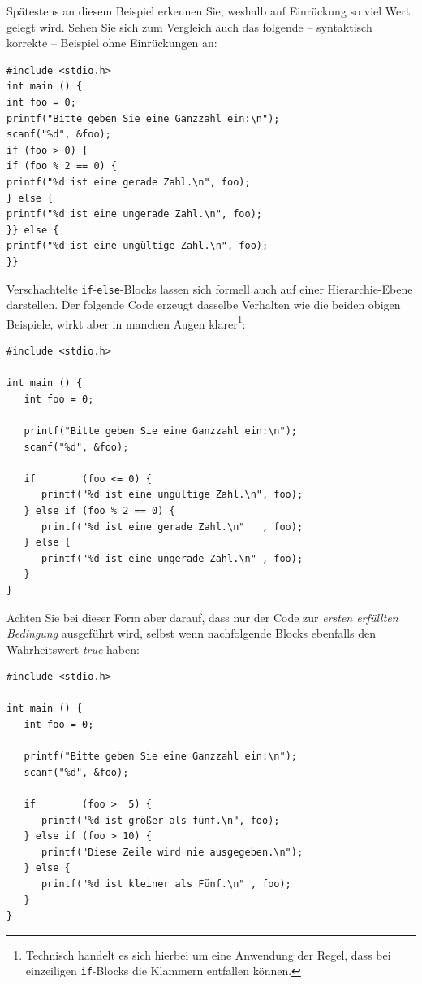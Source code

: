 Spätestens an diesem Beispiel erkennen Sie, weshalb auf Einrückung so viel Wert gelegt wird. Sehen Sie sich zum Vergleich auch das folgende -- syntaktisch korrekte -- Beispiel ohne Einrückungen an:

\begin{warnbox}[Schlechter Stil: Code mit mehreren Hierarchie-Ebenen ohne Einrückungen, leftupper=7mm]
\begin{verbatim}
#include <stdio.h>
int main () {
int foo = 0;
printf("Bitte geben Sie eine Ganzzahl ein:\n");
scanf("%d", &foo);
if (foo > 0) {
if (foo % 2 == 0) {
printf("%d ist eine gerade Zahl.\n", foo);
} else {
printf("%d ist eine ungerade Zahl.\n", foo);
}} else {
printf("%d ist eine ungültige Zahl.\n", foo);
}}
\end{verbatim}
\end{warnbox}

Verschachtelte \texttt{if}-\texttt{else}-Blocks lassen sich formell auch auf einer Hierarchie-Ebene darstellen. Der folgende Code erzeugt dasselbe Verhalten wie die beiden obigen Beispiele, wirkt aber in manchen Augen klarer\footnote{Technisch handelt es sich hierbei um eine Anwendung der Regel, dass bei einzeiligen \texttt{if}-Blocks die Klammern entfallen können.}:

\begin{codebox}
\begin{verbatim}
#include <stdio.h>

int main () {
   int foo = 0;

   printf("Bitte geben Sie eine Ganzzahl ein:\n");
   scanf("%d", &foo);

   if        (foo <= 0) {
      printf("%d ist eine ungültige Zahl.\n", foo);
   } else if (foo % 2 == 0) {
      printf("%d ist eine gerade Zahl.\n"   , foo);
   } else {
      printf("%d ist eine ungerade Zahl.\n" , foo);
   }
}
\end{verbatim}
\end{codebox}

Achten Sie bei dieser Form aber darauf, dass nur der Code zur \emph{ersten erfüllten Bedingung} ausgeführt wird, selbst wenn nachfolgende Blocks ebenfalls den Wahrheitswert \emph{true} haben:

\begin{codebox}
\begin{verbatim}
#include <stdio.h>

int main () {
   int foo = 0;

   printf("Bitte geben Sie eine Ganzzahl ein:\n");
   scanf("%d", &foo);

   if        (foo >  5) {
      printf("%d ist größer als fünf.\n", foo);
   } else if (foo > 10) {
      printf("Diese Zeile wird nie ausgegeben.\n");
   } else {
      printf("%d ist kleiner als Fünf.\n" , foo);
   }
}
\end{verbatim}
\end{codebox}

